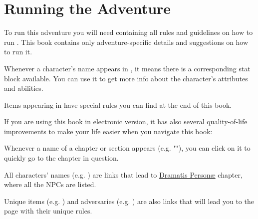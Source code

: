 \section{Running the Adventure}
\label{sec:runningAdventure}

To run this adventure you will need \handbook{} containing all rules and guidelines on how to run \cosmereRPG{}. This book contains only adventure-specific details and suggestions on how to run it.


Whenever a character's name appears in , it means there is a corresponding stat block available. You can use it to get more info about the character's attributes and abilities.

Items appearing in  have special rules you can find at the end of this book.




If you are using this book in electronic version, it has also several quality-of-life improvements to make your life easier when you navigate this book:

Whenever a name of a chapter or section appears (e.g. ""), you can click on it to quickly go to the chapter in question.

All characters' names (e.g. \npcDalinar{}) are links that lead to \hyperref[personae]{Dramatis Person\ae} chapter, where all the NPCs are listed.

Unique items (e.g. \lootSealedMessage{}) and adversaries (e.g. \enemyScribeB{}) are also links that will lead you to the page with their unique rules. 


